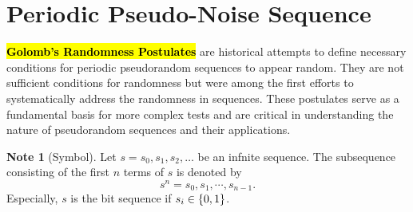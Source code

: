 \documentclass[12pt,openany]{book}
\theoremstyle{definition}
\newtheorem*{note}{Note}
\begin{document}
	\section{Periodic Pseudo-Noise Sequence}
	\hl{\bf Golomb's Randomness Postulates} are historical attempts to define necessary conditions for periodic pseudorandom sequences to appear random. They are not sufficient conditions for randomness but were among the first efforts to systematically address the randomness in sequences. These postulates serve as a fundamental basis for more complex tests and are critical in understanding the nature of pseudorandom sequences and their applications.
	
	\begin{note}[Symbol]
		Let $
		s=s_0,s_1,s_2,\dots
		$ be an infnite sequence. The subsequence consisting of the first $n$ terms of $s$ is denoted by \[
		s^n=s_0,s_1,\cdots,s_{n-1}.
		\] Especially, $s$ is the bit sequence if $s_i\in\set{0,1}$.
	\end{note}
	
\end{document}
